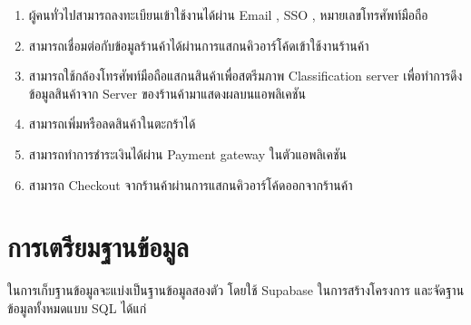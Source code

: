 \begin{enumerate}
  \item ผู้คนทั่วไปสามารถลงทะเบียนเข้าใช้งานได้ผ่าน Email , SSO , หมายเลขโทรศัพท์มือถือ
  \item สามารถเชื่อมต่อกับข้อมูลร้านค้าได้ผ่านการแสกนคิวอาร์โค้ดเข้าใช้งานร้านค้า
  \item สามารถใช้กล้องโทรศัพท์มือถือแสกนสินค้าเพื่อสตรีมภาพ Classification server เพื่อทำการดึงข้อมูลสินค้าจาก Server ของร้านค้ามาแสดงผลบนแอพลิเคชัน
  \item สามารถเพิ่มหรือลดสินค้าในตะกร้าได้
  \item สามารถทำการชำระเงินได้ผ่าน Payment gateway ในตัวแอพลิเคชัน
  \item สามารถ Checkout จากร้านค้าผ่านการแสกนคิวอาร์โค้ดออกจากร้านค้า
 
\end{enumerate}


\section{การเตรียมฐานข้อมูล}
ในการเก็บฐานข้อมูลจะแบ่งเป็นฐานข้อมูลสองตัว โดยใช้ Supabase 
ในการสร้างโครงการ และจัดฐานข้อมูลทั้งหมดแบบ SQL ได้แก่ 
